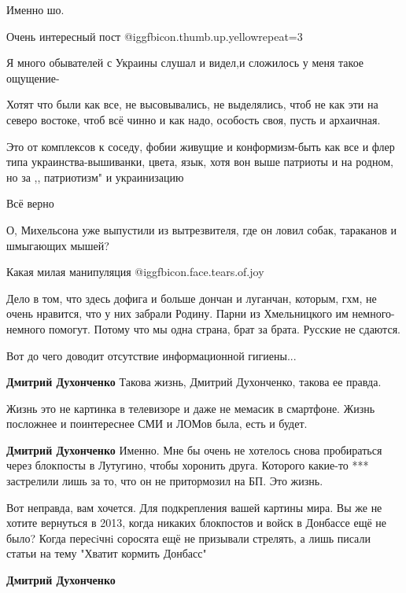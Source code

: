 \begin{itemize}
Именно шо.


Очень интересный пост  @igg{fbicon.thumb.up.yellow}{repeat=3} 

Я много обывателей с Украины слушал и видел,и сложилось у меня такое ощущение-

Хотят что были как все, не высовывались, не выделялись, чтоб не как эти на
северо востоке, чтоб всё чинно и как надо, особость своя, пусть и архаичная.

Это от комплексов к соседу, фобии живущие и конформизм-быть как все и флер типа
украинства-вышиванки, цвета, язык, хотя вон выше патриоты и на родном, но за ,,
патриотизм" и украинизацию


Всё верно

О, Михельсона уже выпустили из вытрезвителя, где он ловил собак, тараканов и шмыгающих мышей?

Какая милая манипуляция  @igg{fbicon.face.tears.of.joy} 


Дело в том, что здесь дофига и больше дончан и луганчан, которым, гхм, не очень
нравится, что у них забрали Родину. Парни из Хмельницкого им немного-немного
помогут. Потому что мы одна страна, брат за брата. Русские не сдаются.

\begin{itemize} %
Вот до чего доводит отсутствие информационной гигиены...

\textbf{Дмитрий Духонченко} Такова жизнь, Дмитрий Духонченко, такова ее правда.

Жизнь это не картинка в телевизоре и даже не мемасик в смартфоне.
Жизнь посложнее и поинтереснее СМИ и ЛОМов была, есть и будет.

\textbf{Дмитрий Духонченко} Именно. Мне бы очень не хотелось снова пробираться через блокпосты в Лутугино, чтобы хоронить друга. Которого какие-то *** застрелили лишь за то, что он не притормозил на БП. Это жизнь.

Вот неправда, вам хочется.
Для подкрепления вашей картины мира.
Вы же не хотите вернуться в 2013, когда никаких блокпостов и войск в Донбассе ещё не было?
Когда пересiчнi соросята ещё не призывали стрелять, а лишь писали статьи на тему "Хватит кормить Донбасс"

\textbf{Дмитрий Духонченко} 


\end{itemize}
\end{itemize}
